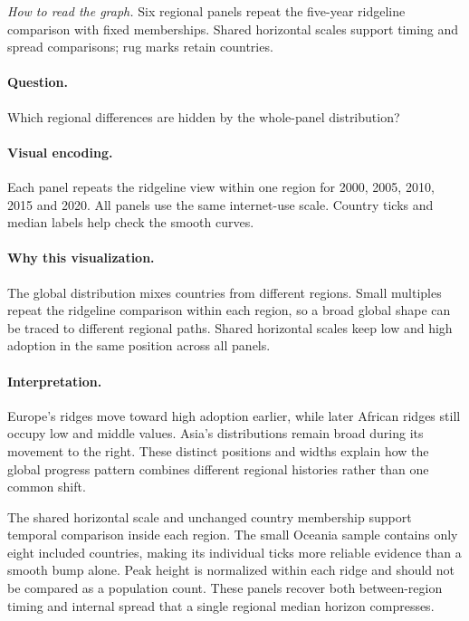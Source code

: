 \documentclass[conference,a4paper]{IEEEtran}
\begin{document}
\noindent\textit{How to read the graph.} Six regional panels repeat the five-year ridgeline comparison with fixed memberships. Shared horizontal scales support timing and spread comparisons; rug marks retain countries.

\paragraph{Question.} Which regional differences are hidden by the whole-panel distribution?



\paragraph{Visual encoding.} Each panel repeats the ridgeline view within one region for 2000, 2005, 2010, 2015 and 2020. All panels use the same internet-use scale. Country ticks and median labels help check the smooth curves.



\paragraph{Why this visualization.} The global distribution mixes countries from different regions. Small multiples repeat the ridgeline comparison within each region, so a broad global shape can be traced to different regional paths. Shared horizontal scales keep low and high adoption in the same position across all panels.



\paragraph{Interpretation.} Europe's ridges move toward high adoption earlier, while later African ridges still occupy low and middle values. Asia's distributions remain broad during its movement to the right. These distinct positions and widths explain how the global progress pattern combines different regional histories rather than one common shift.

The shared horizontal scale and unchanged country membership support temporal comparison inside each region. The small Oceania sample contains only eight included countries, making its individual ticks more reliable evidence than a smooth bump alone. Peak height is normalized within each ridge and should not be compared as a population count. These panels recover both between-region timing and internal spread that a single regional median horizon compresses.
\end{document}
